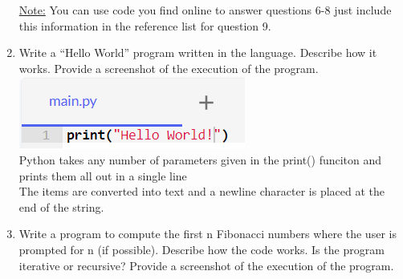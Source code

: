 \documentclass[12pt, letterpaper]{article}
\begin{document}
\begin{enumerate}
  \underline{Note:}  You can use code you find online to answer questions 6-8 just include this information in the
  reference list for question 9.

  \item Write a “Hello World” program written in the language. Describe how it works. Provide a screenshot
  of the execution of the program.
    \includegraphics[scale = 0.8]{hello.PNG}\\
    Python takes any number of parameters given in the print() funciton and prints them all out in a single line\\
    The items are converted into text and a newline character is placed at the end of the string.

  \item Write a program to compute the first n Fibonacci numbers where the user is prompted for n (if
  possible). Describe how the code works. Is the program iterative or recursive? Provide a screenshot of
  the execution of the program.


\end{enumerate}
\end{document}
